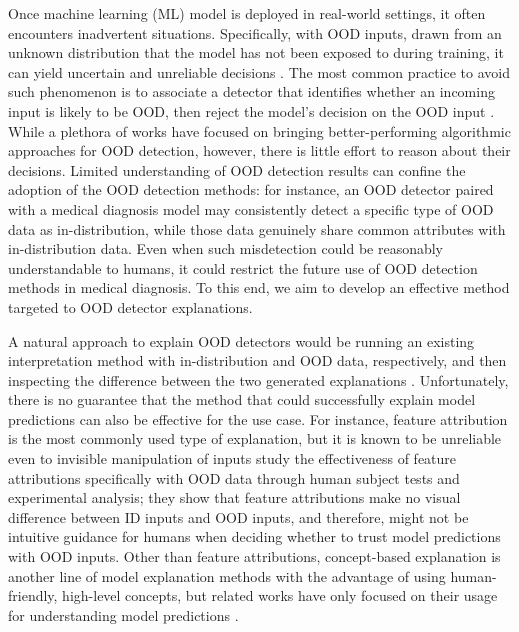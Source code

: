 Once machine learning (ML) model is deployed in real-world settings, it often encounters inadvertent situations.
Specifically, with OOD inputs, drawn from an unknown distribution that the model has not been exposed to during training, it can yield uncertain and unreliable decisions \citep{amodei2016AISafety,goodfellow2015explaining,nguyen2015posterior}.
The most common practice to avoid such phenomenon is to associate a detector that identifies whether an incoming input is likely to be OOD, then reject the model's decision on the OOD input \citep{hendrycks2018OE,lin2021MOOD,mohseni2020self}.
While a plethora of works have focused on bringing better-performing algorithmic approaches for OOD detection, however, there is little effort to reason about their decisions.
Limited understanding of OOD detection results can confine the adoption of the OOD detection methods: for instance, an OOD detector paired with a medical diagnosis model may consistently detect a specific type of OOD data as in-distribution, while those data genuinely share common attributes with in-distribution data.
Even when such misdetection could be reasonably understandable to humans, it could restrict the future use of OOD detection methods in medical diagnosis.
To this end, we aim to develop an effective method targeted to OOD detector explanations.

A natural approach to explain OOD detectors would be running an existing interpretation method with in-distribution and OOD data, respectively, and then inspecting the difference between the two generated explanations \citep{}.
Unfortunately, there is no guarantee that the method that could successfully explain model predictions can also be effective for the use case.
For instance, feature attribution is the most commonly used type of explanation, but it is known to be unreliable even to invisible manipulation of inputs \citep{}
\citep{adebayo2020debugging} study the effectiveness of feature attributions specifically with OOD data through human subject tests and experimental analysis; they show that feature attributions make no visual difference between ID inputs and OOD inputs, and therefore, might not be intuitive guidance for humans when deciding whether to trust model predictions with OOD inputs. 
Other than feature attributions, concept-based explanation is another line of model explanation methods with the advantage of using human-friendly, high-level concepts, but related works have only focused on their usage for understanding model predictions \citep{}.

